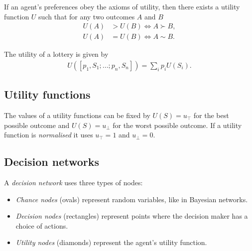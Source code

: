 \documentclass{article}
\begin{document}
\begin{theorem}
    If an agent's preferences obey the axioms of utility, then there
    exists a utility function $U$ such that for any two outcomes $A$
    and $B$
    \begin{align*}
        U(A)&>U(B)\Leftrightarrow A\succ B,\\
        U(A)&=U(B)\Leftrightarrow A\sim B.
    \end{align*} 
\end{theorem}

\begin{theorem}
    The utility of a lottery is given by
    \begin{align*}
        U([p_1,S_1;...;p_n,S_n]) = \sum_i p_i U(S_i).
    \end{align*}
\end{theorem}

\subsection{Utility functions}

\begin{definition}
    The values of a utility functions can be fixed by $U(S)=u_\top$ for the
    best possible outcome and $U(S)=u_\bot$ for the worst possible outcome.
    If a utility function is \emph{normalised} it uses $u_\top = 1$ and
    $u_\bot = 0$.
\end{definition}

\subsection{Decision networks}

\begin{definition}
    A \emph{decision network} uses three types of nodes:
    \begin{itemize}
        \item \emph{Chance nodes} (ovals) represent random variables, like in Bayesian networks.
        \item \emph{Decision nodes} (rectangles) represent points where the decision maker
        has a choice of actions. 
        \item \emph{Utility nodes} (diamonds) represent the agent's utility function.
    \end{itemize}
\end{definition}
\end{document}
